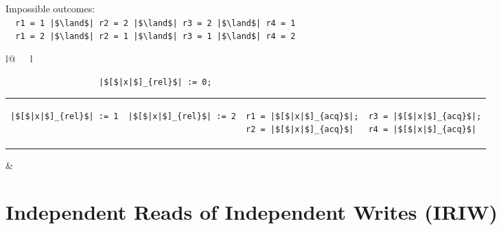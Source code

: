 \begin{minipage}[t]{0.3\linewidth}
Impossible outcomes:\\
\lstinline{  r1 = 1 |$\land$| r2 = 2 |$\land$| r3 = 2 |$\land$| r4 = 1}\\
\lstinline{  r1 = 2 |$\land$| r2 = 1 |$\land$| r3 = 1 |$\land$| r4 = 2}\\
\end{minipage}
%
\begin{minipage}[t]{0.3\linewidth}
\vspace{-.2cm}
  \begin{tabular}{l@{\ \ \ }l}
    \begin{minipage}[l]{4.3cm} \small
\begin{lstlisting}
                   |$[$|x|$]_{rel}$| := 0;
\end{lstlisting}
\vspace{-.2cm}
\begin{tabular}{l||l||l||l}
\begin{lstlisting}
|$[$|x|$]_{rel}$| := 1
\end{lstlisting}
\hspace{.6cm}
&
\begin{lstlisting}
|$[$|x|$]_{rel}$| := 2
\end{lstlisting}
\hspace{.6cm}
&
\begin{lstlisting}
r1 = |$[$|x|$]_{acq}$|;
r2 = |$[$|x|$]_{acq}$|
\end{lstlisting}
\hspace{.6cm}
&
\begin{lstlisting}
r3 = |$[$|x|$]_{acq}$|;
r4 = |$[$|x|$]_{acq}$|
\end{lstlisting}
\end{tabular}
    \end{minipage}
&
  \end{tabular}
\end{minipage}
\litmusTestEnd

\section{Independent Reads of Independent Writes (IRIW)}
\label{app:iriw}

